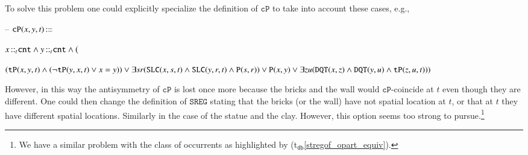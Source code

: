 \documentclass[ao]{iosart2x}
\newcommand{\bflist}{\begin{list}{}{\setlength{\topsep}{2mm}\setlength{\parsep}{0mm}\setlength{\leftmargin}{9.2mm}\setlength{\labelwidth}{8mm}}}
\newcommand{\eflist}{\end{list}}
\newcommand{\dbThrLabel}{\textrm{t$_\texttt{db}$}}
\newcommand{\refdbth}[1]{({\dbThrLabel}\ref{#1})}
\newcommand{\pr}[1]{\mathtt{#1}}
\newcommand{\cn}[1]{\mathtt{#1}}
\newcommand\textequal{%
 \rule[.08ex]{5pt}{0.35pt}\llap{\rule[.78ex]{5pt}{0.35pt}}}
\newcommand{\sdef}{{\hspace{1.5pt}:\hspace{-2.5pt}\textequal\hspace{3pt}}}
\newcommand {\TPd} {\ensuremath{\pr{tP}}}
\newcommand {\Pd} {\ensuremath{\pr{P}}}
\newcommand {\DQTd} {\ensuremath{\pr{DQT}}}
\newcommand {\SLCd} {\ensuremath{\pr{SLC}}}
\newcommand{\cntbcat}{\cn{cnt}}
\newcommand{\bfocpart}{\pr{cP}}
\newcommand{\bfoiof}[1]{{\,::_{#1\:\!}}}
\newcommand{\bfosregof}{\pr{SREG}}
\begin{document}
To solve this problem one could explicitly specialize the definition of $\bfocpart$ to take into account these cases, e.g.,  
\bflist
\item[--] $\bfocpart(x,y,t) \sdef $\parbox[t]{\textwidth} {$x \bfoiof{t} \cntbcat \land y \bfoiof{t} \cntbcat \land \\
($\parbox[t]{\textwidth} {$(\TPd(x,y,t) \land (\neg \TPd(y,x,t) \lor x=y)) \lor \\ 
\exists sr(\SLCd(x,s,t) \land \SLCd(y,r,t) \land \Pd(s,r)) \lor \\ 
\Pd(x,y) \lor \exists zu(\DQTd(x,z) \land \DQTd(y,u) \land \TPd(z,u,t)))$}}
\eflist
However, in this way the antisymmetry of $\bfocpart$ is lost once more because the bricks and the wall would $\bfocpart$-coincide at $t$ even though they are different. One could then change the definition of $\bfosregof$ stating that the bricks (or the wall) have not spatial location at $t$, or that at $t$ they have different spatial locations. Similarly in the case of the statue and the clay. However, this option seems too strong to pursue.\footnote{We have a similar problem with the class of occurrents as highlighted by \refdbth{stregof_opart_equiv}.}
\end{document}
